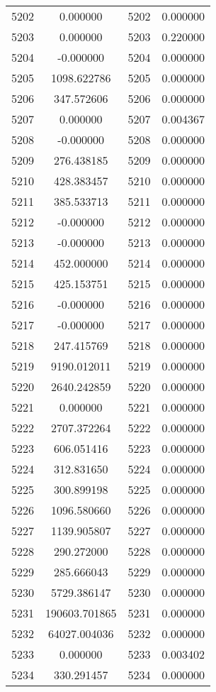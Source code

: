 \documentclass[12pt]{article}
\begin{document}
\begin{longtable}{@{}cccc@{}}
5202 & 0.000000 & 5202 & 0.000000 \\
5203 & 0.000000 & 5203 & 0.220000 \\
5204 & -0.000000 & 5204 & 0.000000 \\
5205 & 1098.622786 & 5205 & 0.000000 \\
5206 & 347.572606 & 5206 & 0.000000 \\
5207 & 0.000000 & 5207 & 0.004367 \\
5208 & -0.000000 & 5208 & 0.000000 \\
5209 & 276.438185 & 5209 & 0.000000 \\
5210 & 428.383457 & 5210 & 0.000000 \\
5211 & 385.533713 & 5211 & 0.000000 \\
5212 & -0.000000 & 5212 & 0.000000 \\
5213 & -0.000000 & 5213 & 0.000000 \\
5214 & 452.000000 & 5214 & 0.000000 \\
5215 & 425.153751 & 5215 & 0.000000 \\
5216 & -0.000000 & 5216 & 0.000000 \\
5217 & -0.000000 & 5217 & 0.000000 \\
5218 & 247.415769 & 5218 & 0.000000 \\
5219 & 9190.012011 & 5219 & 0.000000 \\
5220 & 2640.242859 & 5220 & 0.000000 \\
5221 & 0.000000 & 5221 & 0.000000 \\
5222 & 2707.372264 & 5222 & 0.000000 \\
5223 & 606.051416 & 5223 & 0.000000 \\
5224 & 312.831650 & 5224 & 0.000000 \\
5225 & 300.899198 & 5225 & 0.000000 \\
5226 & 1096.580660 & 5226 & 0.000000 \\
5227 & 1139.905807 & 5227 & 0.000000 \\
5228 & 290.272000 & 5228 & 0.000000 \\
5229 & 285.666043 & 5229 & 0.000000 \\
5230 & 5729.386147 & 5230 & 0.000000 \\
5231 & 190603.701865 & 5231 & 0.000000 \\
5232 & 64027.004036 & 5232 & 0.000000 \\
5233 & 0.000000 & 5233 & 0.003402 \\
5234 & 330.291457 & 5234 & 0.000000 \\

\end{longtable}
\end{document}
